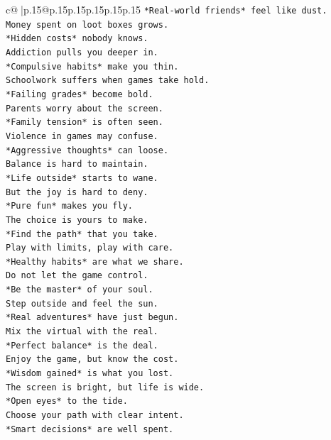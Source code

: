 \documentclass{article}
\begin{document}
{\begin{supertabular}{c@{$\;$}|p{.15\linewidth}@{}p{.15\linewidth}p{.15\linewidth}p{.15\linewidth}p{.15\linewidth}p{.15\linewidth}}
{{{\texttt{*Real{-}world friends* feel like dust.} \\
\texttt{Money spent on loot boxes grows.} \\
\texttt{*Hidden costs* nobody knows.} \\
\texttt{Addiction pulls you deeper in.} \\
\texttt{*Compulsive habits* make you thin.} \\
\texttt{Schoolwork suffers when games take hold.} \\
\texttt{*Failing grades* become bold.} \\
\texttt{Parents worry about the screen.} \\
\texttt{*Family tension* is often seen.} \\
\texttt{Violence in games may confuse.} \\
\texttt{*Aggressive thoughts* can loose.} \\
\texttt{Balance is hard to maintain.} \\
\texttt{*Life outside* starts to wane.} \\
\texttt{But the joy is hard to deny.} \\
\texttt{*Pure fun* makes you fly.} \\
\texttt{The choice is yours to make.} \\
\texttt{*Find the path* that you take.} \\
\texttt{Play with limits, play with care.} \\
\texttt{*Healthy habits* are what we share.} \\
\texttt{Do not let the game control.} \\
\texttt{*Be the master* of your soul.} \\
\texttt{Step outside and feel the sun.} \\
\texttt{*Real adventures* have just begun.} \\
\texttt{Mix the virtual with the real.} \\
\texttt{*Perfect balance* is the deal.} \\
\texttt{Enjoy the game, but know the cost.} \\
\texttt{*Wisdom gained* is what you lost.} \\
\texttt{The screen is bright, but life is wide.} \\
\texttt{*Open eyes* to the tide.} \\
\texttt{Choose your path with clear intent.} \\
\texttt{*Smart decisions* are well spent.} \\
}}}
\end{supertabular}}
\end{document}
